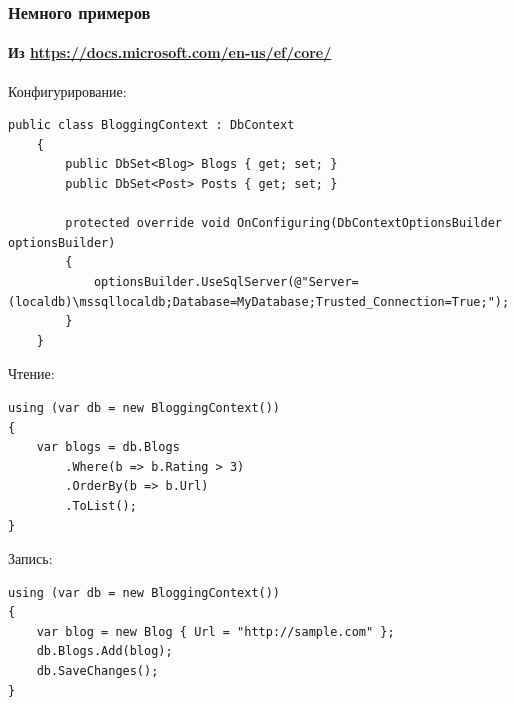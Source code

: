 \documentclass[xetex,mathserif,serif]{beamer}
\begin{document}
	\begin{frame}[fragile]
		\frametitle{Немного примеров}
		\framesubtitle{Из \url{https://docs.microsoft.com/en-us/ef/core/}}
		\begin{tiny}
			Конфигурирование:
			\begin{verbatim}
public class BloggingContext : DbContext
    {
        public DbSet<Blog> Blogs { get; set; }
        public DbSet<Post> Posts { get; set; }

        protected override void OnConfiguring(DbContextOptionsBuilder optionsBuilder)
        {
            optionsBuilder.UseSqlServer(@"Server=(localdb)\mssqllocaldb;Database=MyDatabase;Trusted_Connection=True;");
        }
    }
			\end{verbatim}
			Чтение:
			\begin{verbatim}
using (var db = new BloggingContext())
{
    var blogs = db.Blogs
        .Where(b => b.Rating > 3)
        .OrderBy(b => b.Url)
        .ToList();
}
			\end{verbatim}
			Запись:
			\begin{verbatim}
using (var db = new BloggingContext())
{
    var blog = new Blog { Url = "http://sample.com" };
    db.Blogs.Add(blog);
    db.SaveChanges();
}
			\end{verbatim}
		\end{tiny}
	\end{frame}
\end{document}

